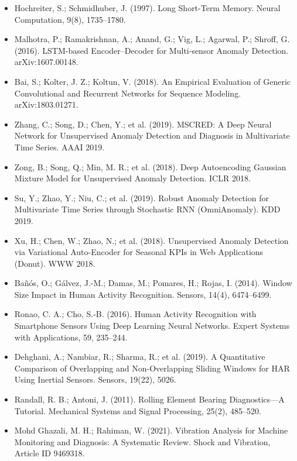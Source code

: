\begin{itemize}
    \item Hochreiter, S.; Schmidhuber, J. (1997). Long Short-Term Memory. Neural Computation, 9(8), 1735–1780.
    \item Malhotra, P.; Ramakrishnan, A.; Anand, G.; Vig, L.; Agarwal, P.; Shroff, G. (2016). LSTM-based Encoder–Decoder for Multi-sensor Anomaly Detection. arXiv:1607.00148.
    \item Bai, S.; Kolter, J. Z.; Koltun, V. (2018). An Empirical Evaluation of Generic Convolutional and Recurrent Networks for Sequence Modeling. arXiv:1803.01271.
    \item Zhang, C.; Song, D.; Chen, Y.; et al. (2019). MSCRED: A Deep Neural Network for Unsupervised Anomaly Detection and Diagnosis in Multivariate Time Series. AAAI 2019.
    \item Zong, B.; Song, Q.; Min, M. R.; et al. (2018). Deep Autoencoding Gaussian Mixture Model for Unsupervised Anomaly Detection. ICLR 2018.
    \item Su, Y.; Zhao, Y.; Niu, C.; et al. (2019). Robust Anomaly Detection for Multivariate Time Series through Stochastic RNN (OmniAnomaly). KDD 2019.
    \item Xu, H.; Chen, W.; Zhao, N.; et al. (2018). Unsupervised Anomaly Detection via Variational Auto-Encoder for Seasonal KPIs in Web Applications (Donut). WWW 2018.
    \item Bañós, O.; Gálvez, J.-M.; Damas, M.; Pomares, H.; Rojas, I. (2014). Window Size Impact in Human Activity Recognition. Sensors, 14(4), 6474–6499.
    \item Ronao, C. A.; Cho, S.-B. (2016). Human Activity Recognition with Smartphone Sensors Using Deep Learning Neural Networks. Expert Systems with Applications, 59, 235–244.
    \item Dehghani, A.; Nambiar, R.; Sharma, R.; et al. (2019). A Quantitative Comparison of Overlapping and Non-Overlapping Sliding Windows for HAR Using Inertial Sensors. Sensors, 19(22), 5026.
    \item Randall, R. B.; Antoni, J. (2011). Rolling Element Bearing Diagnostics—A Tutorial. Mechanical Systems and Signal Processing, 25(2), 485–520.
    \item Mohd Ghazali, M. H.; Rahiman, W. (2021). Vibration Analysis for Machine Monitoring and Diagnosis: A Systematic Review. Shock and Vibration, Article ID 9469318.
\end{itemize}


